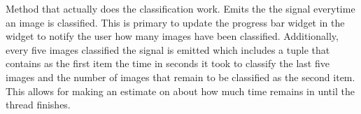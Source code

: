 \documentclass[letterpaper,10pt,english]{sphinxmanual}
\begin{document}
\begin{fulllineitems}
\begin{fulllineitems}
\label{\detokenize{polo.threads:polo.threads.thread.ClassificationThread.run}}
Method that actually does the classification work. Emits the the
{\hyperref[\detokenize{polo.threads:polo.threads.thread.ClassificationThread.change_value}]{}} signal everytime an image is classified. This is primary
to update the progress bar widget in the  widget to
notify the user how many images have been classified. Additionally,
every five images classified the {\hyperref[\detokenize{polo.threads:polo.threads.thread.ClassificationThread.estimated_time}]{}} signal is emitted
which includes a tuple that contains as the first item the time in
seconds it took to classify the last five images and the number
of images that remain to be classified as the second item. This allows
for making an estimate on about how much time remains in until the
thread finishes.

\end{fulllineitems}


\end{fulllineitems}

\end{document}
